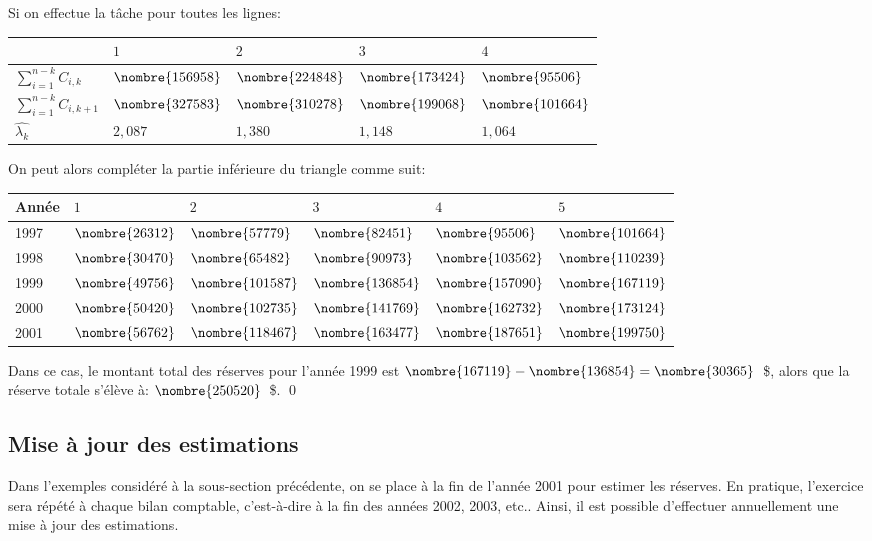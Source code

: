 \begin{exemple}
  Si on effectue la tâche pour toutes les lignes:
  \begin{center}
    \begin{tabular}{|l|l l l l|}\hline
      & $1$ & $2$ & $3$ & $4$   \\ \hline
      $\sum_{i=1}^{n-k} C_{i,k}$  &$\nombre{156958}$ &$\nombre{224848}$ & $\nombre{173424}$&$\nombre{95506}$ \\
      $\sum_{i=1}^{n-k} C_{i,k+1}$ &$\nombre{327583}$ &$\nombre{310278}$&$\nombre{199068}$&$\nombre{101664}$  \\
      $\hat{\lambda_k}$ & $2,087$ &$1,380$ &	$1,148$ &	$1,064$ \\\hline
    \end{tabular}
  \end{center}
  On peut alors compléter la partie inférieure du triangle comme suit:
  \begin{center}
    \begin{tabular}{|l|l l l l l|}\hline
      Année & $1$ & $2$ & $3$ & $4$ & $5$  \\ \hline
      1997 &$\nombre{26312}$&	$\nombre{57779}$&$\nombre{82451}$&$\nombre{95506}$&$\nombre{101664}$\\
      1998 &$\nombre{30470}$&	$\nombre{65482}$&$\nombre{90973}$&$\nombre{103562}$&$\nombre{110239}$\\
      1999 &$\nombre{49756}$&	$\nombre{101587}$&$\nombre{136854}$&$\nombre{157090}$&$\nombre{167119}$\\
      2000 &$\nombre{50420}$&	$\nombre{102735}$&$\nombre{141769}$&$\nombre{162732}$&$\nombre{173124}$\\
      2001 &$\nombre{56762}$&	$\nombre{118467}$&$\nombre{163477}$&$\nombre{187651}$&$\nombre{199750}$\\ \hline
    \end{tabular}
  \end{center}
  Dans ce cas, le montant total des réserves pour l'année 1999 est
  $\nombre{167119} - \nombre{136854} = \nombre{30365}$~\$, alors
  que la réserve totale s'élève à: $\nombre{250520}$~\$. %
  \qed
\end{exemple}

\subsection{Mise à jour des estimations}
\label{sec:deterministe:CL:maj}

Dans l'exemples considéré à la sous-section précédente, on se place à
la fin de l'année 2001 pour estimer les réserves. En pratique,
l'exercice sera répété à chaque bilan comptable, c'est-à-dire à la fin
des années 2002, 2003, etc.. Ainsi, il est possible d'effectuer
annuellement une mise à jour des estimations.

